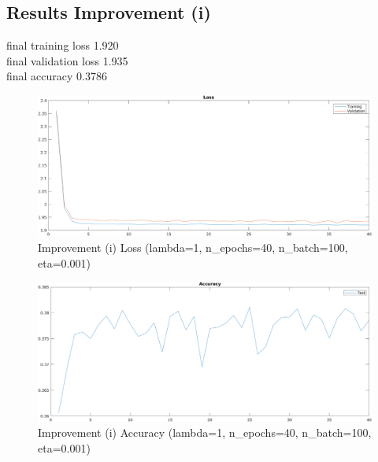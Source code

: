 \newpage

\subsection{Results Improvement (i)} 

final training loss 1.920\\
final validation loss 1.935\\
final accuracy 0.3786\\
    \begin{figure}[ht]
        \includegraphics[width=\textwidth]{../code/result_pics/lambda=1, n_epochs=40, n_batch=100, eta=.001 all data for training/loss.png}
        \caption{Improvement (i) Loss (lambda=1, n\_epochs=40, n\_batch=100, eta=0.001)}
        \label{fig:lossa}
    \end{figure}
    \begin{figure}[ht]
        \includegraphics[width=\textwidth]{../code/result_pics/lambda=1, n_epochs=40, n_batch=100, eta=.001 all data for training/accuracy.png}
        \caption{Improvement (i) Accuracy (lambda=1, n\_epochs=40, n\_batch=100, eta=0.001)}
        \label{fig:accuracya}
    \end{figure}
